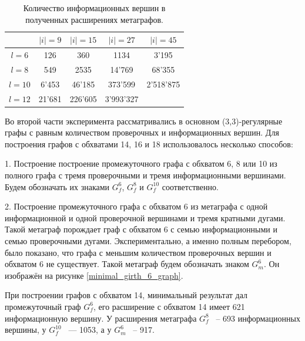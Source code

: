 \documentclass[14pt]{mmcs-article}
\begin{document}
\begin{table}[H]
    \centering
    \begin{tabular}{ | c | c | c | c | c | }
        \hline
                   & $|i| = 9$         & $|i| = 15$        & $|i| = 27$      & $|i| = 45$  \\ \hline
        $ l = 6 $  & 126               & 360               & 1134            & 3'195       \\ \hline
        $ l = 8 $  & 549               & 2535              & 14'769          & 68'355      \\ \hline
        $ l = 10 $ & 6'453             & 46'185            & 373'599         & 2'518'875   \\ \hline
        $ l = 12 $ & 21'681            & 226'605           & 3'993'327       &             \\ \hline
    \end{tabular}
    \caption{ Количество информационных вершин в полученных расширениях метаграфов. }
    \label{info_vertex_count_table}
\end{table}

Во второй части эксперимента рассматривались в основном (3,3)-регулярные графы с равным количеством проверочных и информационных вершин. Для построения графов с обхватами 14, 16 и 18 использовалось несколько способов:

1. Построение построение промежуточного графа с обхватом 6, 8 или 10 из полного графа с тремя проверочными и тремя информационными вершинами. Будем обозначать их знаками $G_f^6$, $G_f^8$ и $G_f^10$ соответственно.

2. Построение промежуточного графа с обхватом 6 из метаграфа с одной информационной и одной проверочной вершинами и тремя кратными дугами. Такой метаграф порождает граф с обхватом 6 с семью информационными и семью проверочными дугами. Экспериментально, а именно полным перебором, было показано, что графа с меньшим количеством проверочных вершин и обхватом 6 не существует. Такой метаграф будем обозначать знаком $G_m^6$. Он изображён на рисунке \ref{minimal_girth_6_graph}.

При построении графов с обхватом 14, минимальный результат дал промежуточный граф $G_f^6$, его расширение с обхватом 14 имеет 621 информационную вершину. У расширения метаграфа $G_f^8$ ~-- 693 информационных вершины, у $G_f^{10}$ ~--- 1053, а у $G_m^{6}$ ~-- 917.
\end{document}
